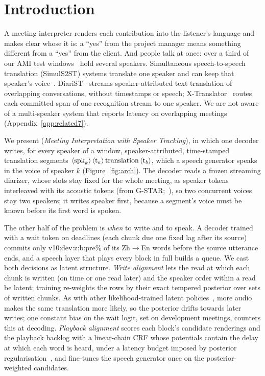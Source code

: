 \section{Introduction}
\label{sec:intro}

A meeting interpreter renders each contribution into the listener's language and makes clear whose it is: a
``yes'' from the project manager means something different from a ``yes'' from the client. And people talk at once: over a third of our AMI test windows~\citep{carletta2005ami} hold several speakers.
Simultaneous speech-to-speech translation (SimulS2ST) systems translate one speaker and can keep that speaker's
voice~\citep{seamless2023,labiausse2025hibiki,cheng2025liveinterpret,deng2025simuls2s}. DiariST~\citep{yang2024diarist}
streams speaker-attributed text translation of overlapping conversations, without timestamps or speech;
X-Translator~\citep{zhao2026xtranslator} routes each committed span of one recognition stream to one speaker. We are not aware of a multi-speaker
system that reports latency on overlapping meetings (Appendix~\ref{app:related7}).

We present \sys{} (\emph{Meeting Interpretation with Speaker Tracking}), in which one decoder writes, for every speaker
of a window, speaker-attributed, time-stamped translation segments $\langle\mathrm{spk}_{k}\rangle\,\langle\mathrm{t}_{a}\rangle\,\text{translation}\,\langle\mathrm{t}_{b}\rangle$,
which a speech generator speaks in the voice of speaker $k$ (Figure~\ref{fig:arch}). The decoder reads a frozen
streaming diarizer, whose slots stay fixed for the whole meeting, as speaker tokens interleaved with its acoustic tokens
(from G-STAR;~\citealp{peng2026gstar}), so two concurrent voices stay two speakers; it writes speaker first, because a
segment's voice must be known before its first word is spoken.

The other half of the problem is \emph{when} to write and to speak. A decoder trained with a wait token on deadlines
(each chunk due one fixed lag after its source) commits only \num{v10:dev:z:b:pre}\% of its Zh$\rightarrow$En words
before the source utterance ends, and a speech layer that plays every block in full builds a queue. We cast both decisions as latent structure. \emph{Write alignment} lets the read at which
each chunk is written (on time or one read later) and the speaker order within a read be latent; training re-weights the
rows by their exact tempered posterior over sets of written chunks. As with other likelihood-trained latent
policies~\citep{arivazhagan2019milk,ma2020mma}, more audio makes the same translation more likely, so the posterior drifts
towards later writes; one constant bias on the wait logit, set on development meetings, counters this at decoding.
\emph{Playback alignment} scores each block's candidate renderings and the playback backlog with a linear-chain CRF
whose potentials contain the delay at which each word is heard, under a latency budget imposed by posterior
regularisation~\citep{ganchev2010posterior}, and fine-tunes the speech generator once on the posterior-weighted
candidates.


